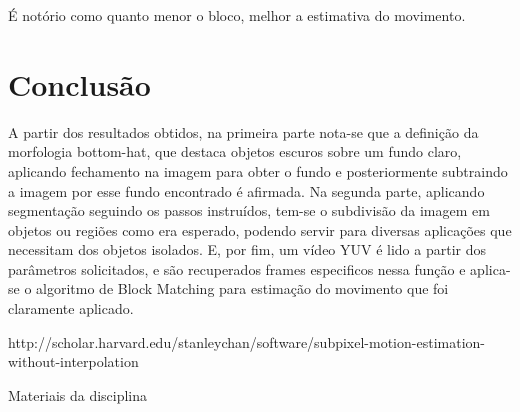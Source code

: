\documentclass[journal]{IEEEtran}
\begin{document}
\begin{figure}[h]
\end{figure}

É notório como quanto menor o bloco, melhor a estimativa do movimento.

\ifCLASSOPTIONcaptionsoff
  \newpage
\fi

\section{Conclusão}
A partir dos resultados obtidos, na primeira parte nota-se que a definição da morfologia bottom-hat, que destaca objetos escuros sobre um fundo claro, aplicando fechamento na imagem para obter o fundo e posteriormente subtraindo a imagem por esse fundo encontrado é afirmada. Na segunda parte, aplicando segmentação seguindo os passos instruídos, tem-se o subdivisão da imagem em objetos ou regiões como era esperado, podendo servir para diversas aplicações que necessitam dos objetos isolados. E, por fim, um vídeo YUV é lido a partir dos parâmetros solicitados, e são recuperados frames especificos nessa função e aplica-se o algoritmo de Block Matching para estimação do movimento que foi claramente aplicado.

\begin{thebibliography}{1}


http://scholar.harvard.edu/stanleychan/software/subpixel-motion-estimation-without-interpolation

Materiais da disciplina

\end{thebibliography}
\end{document}
